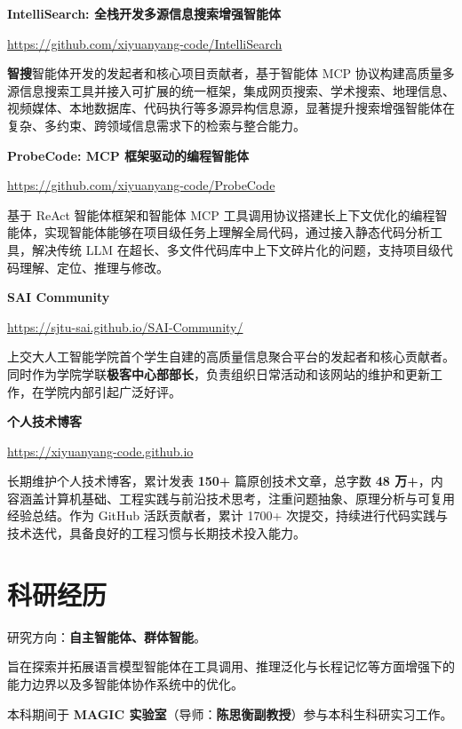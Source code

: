 \documentclass[letterpaper,11pt]{article}
\begin{document}
\textbf{IntelliSearch: 全栈开发多源信息搜索增强智能体}

\url{https://github.com/xiyuanyang-code/IntelliSearch}

\textbf{智搜}智能体开发的发起者和核心项目贡献者，基于智能体 MCP 协议构建高质量多源信息搜索工具并接入可扩展的统一框架，集成网页搜索、学术搜索、地理信息、视频媒体、本地数据库、代码执行等多源异构信息源，显著提升搜索增强智能体在复杂、多约束、跨领域信息需求下的检索与整合能力。

\medskip

\textbf{ProbeCode: MCP 框架驱动的编程智能体}

\url{https://github.com/xiyuanyang-code/ProbeCode}

基于 ReAct 智能体框架和智能体 MCP 工具调用协议搭建长上下文优化的编程智能体，实现智能体能够在项目级任务上理解全局代码，通过接入静态代码分析工具，解决传统 LLM 在超长、多文件代码库中上下文碎片化的问题，支持项目级代码理解、定位、推理与修改。

\medskip

\textbf{SAI Community}

\url{https://sjtu-sai.github.io/SAI-Community/}

上交大人工智能学院首个学生自建的高质量信息聚合平台的发起者和核心贡献者。同时作为学院学联\textbf{极客中心部部长}，负责组织日常活动和该网站的维护和更新工作，在学院内部引起广泛好评。

\medskip

\textbf{个人技术博客}

\url{https://xiyuanyang-code.github.io}

长期维护个人技术博客，累计发表 \textbf{150+} 篇原创技术文章，总字数 \textbf{48 万+}，内容涵盖计算机基础、工程实践与前沿技术思考，注重问题抽象、原理分析与可复用经验总结。作为 GitHub 活跃贡献者，累计 1700+ 次提交，持续进行代码实践与技术迭代，具备良好的工程习惯与长期技术投入能力。

\newpage
\section{科研经历}

研究方向：\textbf{自主智能体、群体智能}。

旨在探索并拓展语言模型智能体在工具调用、推理泛化与长程记忆等方面增强下的能力边界以及多智能体协作系统中的优化。

本科期间于 \textbf{MAGIC 实验室}（导师：\textbf{陈思衡副教授}）参与本科生科研实习工作。

\medskip
\end{document}
